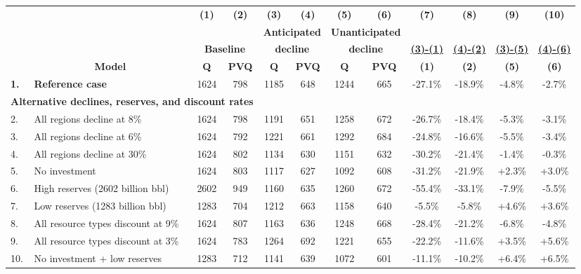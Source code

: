 \begin{tabular} {l l c c c c c c c c c c} \midrule \midrule 
 & & \textbf{(1)} & \textbf{(2)} & \textbf{(3)} & \textbf{(4)} & \textbf{(5)} & \textbf{(6)} & \textbf{(7)} & \textbf{(8)} & \textbf{(9)} & \textbf{(10)} \\ 
 & & & & \multicolumn{2}{c}{\textbf{Anticipated}} & \multicolumn{2}{c}{\textbf{Unanticipated}} & & & & \\ 
 & & \multicolumn{2}{c}{\textbf{Baseline}} & \multicolumn{2}{c}{\textbf{decline}} & \multicolumn{2}{c}{\textbf{decline}} &
    \underline{\textbf{(3)-(1)}} & \underline{\textbf{(4)-(2)}} & \underline{\textbf{(3)-(5)}} & \underline{\textbf{(4)-(6)}} \\ 
 & \multicolumn{1}{c}{\textbf{Model}} & \textbf{Q} & \textbf{PVQ} & \textbf{Q} & \textbf{PVQ} & \textbf{Q} & \textbf{PVQ} & 
    \textbf{(1)} & \textbf{(2)} & \textbf{(5)} & \textbf{(6)} \\ 
\midrule 
\textbf{1.} & \textbf{Reference case} & 1624 & 798 & 1185 & 648 & 1244 & 665 & -27.1\% & -18.9\% & -4.8\% & -2.7\% \\ 
\midrule 
\multicolumn{4}{l}{\textbf{Alternative declines, reserves, and discount rates}} & & & & & & & & \\ 
2. & All regions decline at 8\% & 1624 & 798 & 1191 & 651 & 1258 & 672 & -26.7\% & -18.4\% & -5.3\% & -3.1\% \\ 
3. & All regions decline at 6\% & 1624 & 792 & 1221 & 661 & 1292 & 684 & -24.8\% & -16.6\% & -5.5\% & -3.4\% \\ 
4. & All regions decline at 30\% & 1624 & 802 & 1134 & 630 & 1151 & 632 & -30.2\% & -21.4\% & -1.4\% & -0.3\% \\ 
5. & No investment & 1624 & 803 & 1117 & 627 & 1092 & 608 & -31.2\% & -21.9\% & +2.3\% & +3.0\% \\ 
6. & High reserves (2602 billion bbl) & 2602 & 949 & 1160 & 635 & 1260 & 672 & -55.4\% & -33.1\% & -7.9\% & -5.5\% \\ 
7. & Low reserves (1283 billion bbl) & 1283 & 704 & 1212 & 663 & 1158 & 640 & -5.5\% & -5.8\% & +4.6\% & +3.6\% \\ 
8. & All resource types discount at 9\% & 1624 & 807 & 1163 & 636 & 1248 & 668 & -28.4\% & -21.2\% & -6.8\% & -4.8\% \\ 
9. & All resource types discount at 3\% & 1624 & 783 & 1264 & 692 & 1221 & 655 & -22.2\% & -11.6\% & +3.5\% & +5.6\% \\ 
10. & No investment + low reserves & 1283 & 712 & 1141 & 639 & 1072 & 601 & -11.1\% & -10.2\% & +6.4\% & +6.5\% \\ 

\end{tabular}
